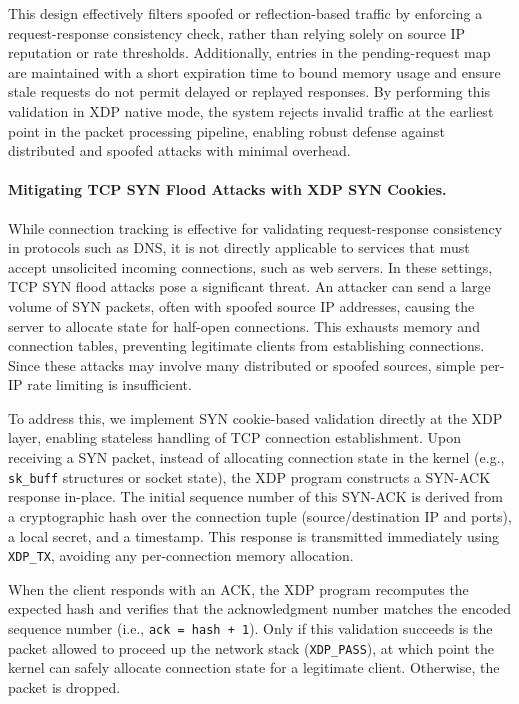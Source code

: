 \documentclass[twocolumn, 10pt]{scrartcl}
\begin{document}
This design effectively filters spoofed or reflection-based traffic by enforcing a request-response consistency check, rather than relying solely on source IP reputation or rate thresholds. Additionally, entries in the pending-request map are maintained with a short expiration time to bound memory usage and ensure stale requests do not permit delayed or replayed responses. By performing this validation in XDP native mode, the system rejects invalid traffic at the earliest point in the packet processing pipeline, enabling robust defense against distributed and spoofed attacks with minimal overhead.

\paragraph{Mitigating TCP SYN Flood Attacks with XDP SYN Cookies.}
While connection tracking is effective for validating request-response consistency in protocols such as DNS, it is not directly applicable to services that must accept unsolicited incoming connections, such as web servers. In these settings, TCP SYN flood attacks pose a significant threat. An attacker can send a large volume of SYN packets, often with spoofed source IP addresses, causing the server to allocate state for half-open connections. This exhausts memory and connection tables, preventing legitimate clients from establishing connections. Since these attacks may involve many distributed or spoofed sources, simple per-IP rate limiting is insufficient.

To address this, we implement SYN cookie-based validation directly at the XDP layer, enabling stateless handling of TCP connection establishment. Upon receiving a SYN packet, instead of allocating connection state in the kernel (e.g., \texttt{sk\_buff} structures or socket state), the XDP program constructs a SYN-ACK response in-place. The initial sequence number of this SYN-ACK is derived from a cryptographic hash over the connection tuple (source/destination IP and ports), a local secret, and a timestamp. This response is transmitted immediately using \texttt{XDP\_TX}, avoiding any per-connection memory allocation.

When the client responds with an ACK, the XDP program recomputes the expected hash and verifies that the acknowledgment number matches the encoded sequence number (i.e., \texttt{ack = hash + 1}). Only if this validation succeeds is the packet allowed to proceed up the network stack (\texttt{XDP\_PASS}), at which point the kernel can safely allocate connection state for a legitimate client. Otherwise, the packet is dropped.
\end{document}
